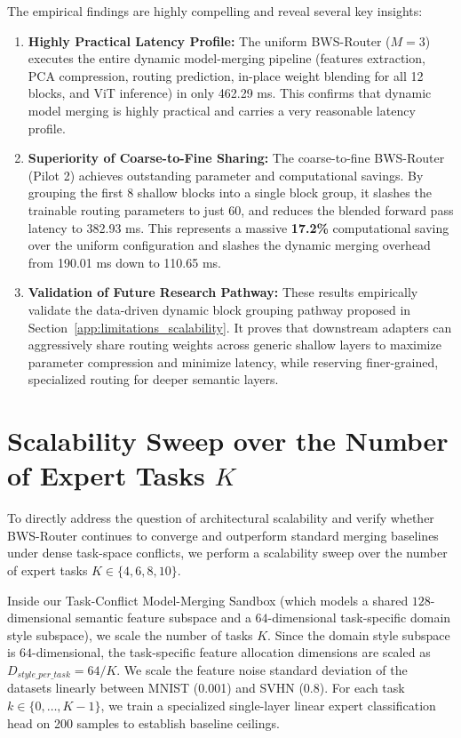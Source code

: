 The empirical findings are highly compelling and reveal several key insights:
\begin{enumerate}
    \item \textbf{Highly Practical Latency Profile:} The uniform BWS-Router ($M=3$) executes the entire dynamic model-merging pipeline (features extraction, PCA compression, routing prediction, in-place weight blending for all 12 blocks, and ViT inference) in only 462.29 ms. This confirms that dynamic model merging is highly practical and carries a very reasonable latency profile.
    \item \textbf{Superiority of Coarse-to-Fine Sharing:} The coarse-to-fine BWS-Router (Pilot 2) achieves outstanding parameter and computational savings. By grouping the first 8 shallow blocks into a single block group, it slashes the trainable routing parameters to just 60, and reduces the blended forward pass latency to 382.93 ms. This represents a massive \textbf{17.2\%} computational saving over the uniform configuration and slashes the dynamic merging overhead from 190.01 ms down to 110.65 ms.
    \item \textbf{Validation of Future Research Pathway:} These results empirically validate the data-driven dynamic block grouping pathway proposed in Section~\ref{app:limitations_scalability}. It proves that downstream adapters can aggressively share routing weights across generic shallow layers to maximize parameter compression and minimize latency, while reserving finer-grained, specialized routing for deeper semantic layers.
\end{enumerate}

\section{Scalability Sweep over the Number of Expert Tasks $K$}
\label{app:expert_scaling}
To directly address the question of architectural scalability and verify whether BWS-Router continues to converge and outperform standard merging baselines under dense task-space conflicts, we perform a scalability sweep over the number of expert tasks $K \in \{4, 6, 8, 10\}$.

Inside our Task-Conflict Model-Merging Sandbox (which models a shared $128$-dimensional semantic feature subspace and a $64$-dimensional task-specific domain style subspace), we scale the number of tasks $K$. Since the domain style subspace is $64$-dimensional, the task-specific feature allocation dimensions are scaled as $D_{style\_per\_task} = 64 / K$. We scale the feature noise standard deviation of the datasets linearly between MNIST (0.001) and SVHN (0.8). For each task $k \in \{0, \dots, K-1\}$, we train a specialized single-layer linear expert classification head on 200 samples to establish baseline ceilings.

